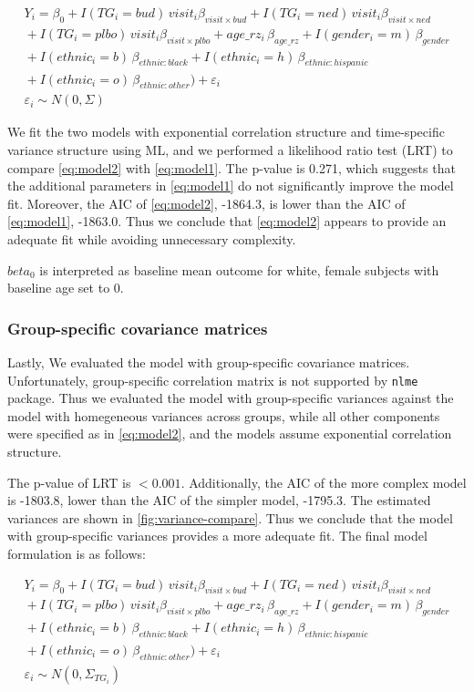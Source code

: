 \documentclass[12pt]{article}
\begin{document}
\begin{multline}
\label{eq:model2}
Y_{i} = \beta_{0} + I(TG_i = bud)\,visit_{i}\beta_{visit \times bud}
+ I(TG_i = ned)\,visit_{i}\beta_{visit \times ned} \\
{}+ I(TG_i = plbo)\,visit_{i}\beta_{visit \times plbo}
+ age\_rz_{i}\,\beta_{age\_rz}
+ I(gender_{i} = m)\,\beta_{gender}\\
{}+ I(ethnic_{i} = b)\,\beta_{ethnic:black}
+ I(ethnic_{i} = h)\,\beta_{ethnic:hispanic}\\
{}+ I(ethnic_{i} = o)\,\beta_{ethnic:other})
+ \varepsilon_{i}\\
\varepsilon_{i} \sim N(0,\Sigma)
\end{multline}

We fit the two models with exponential correlation structure
and time-specific variance structure using ML,
and we performed a likelihood ratio test (LRT) to compare \cref{eq:model2}
with \cref{eq:model1}. The p-value is 0.271,
which suggests that the additional parameters in \cref{eq:model1}
do not significantly improve the model fit.
Moreover, the AIC of \cref{eq:model2}, -1864.3, is lower than
the AIC of \cref{eq:model1}, -1863.0. Thus we conclude that
\cref{eq:model2} appears to provide an adequate fit while
avoiding unnecessary complexity.

$beta_0$ is interpreted as baseline mean outcome for white, female
subjects with baseline age set to 0.

\subsubsection{Group-specific covariance matrices}

Lastly, We evaluated the model with group-specific covariance matrices.
Unfortunately, group-specific correlation matrix is not supported
by \texttt{nlme} package. Thus we evaluated the model with
group-specific variances against the model with homegeneous variances
across groups, while all other components were specified as in \cref{eq:model2},
and the models assume exponential correlation structure.

The p-value of LRT is $< 0.001$.
Additionally, the AIC of the more complex model is -1803.8,
lower than the AIC of the simpler model, -1795.3. The estimated
variances are shown in \cref{fig:variance-compare}. Thus we
conclude that the model
with group-specific variances provides a more adequate fit.
The final model formulation is as follows:


\begin{multline}
\label{eq:model3}
Y_{i} = \beta_{0} + I(TG_i = bud)\,visit_{i}\beta_{visit \times bud}
+ I(TG_i = ned)\,visit_{i}\beta_{visit \times ned} \\
{}+ I(TG_i = plbo)\,visit_{i}\beta_{visit \times plbo}
+ age\_rz_{i}\,\beta_{age\_rz}
+ I(gender_{i} = m)\,\beta_{gender}\\
{}+ I(ethnic_{i} = b)\,\beta_{ethnic:black}
+ I(ethnic_{i} = h)\,\beta_{ethnic:hispanic}\\
{}+ I(ethnic_{i} = o)\,\beta_{ethnic:other})
+ \varepsilon_{i}\\
\varepsilon_{i} \sim N(0,\Sigma_{TG_i})
\end{multline}
\end{document}
